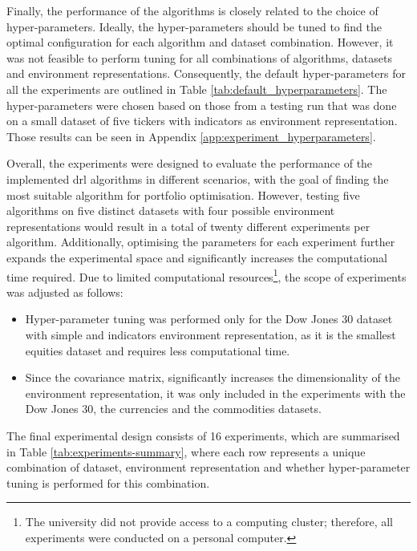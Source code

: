 Finally, the performance of the algorithms is closely related to the choice of hyper-parameters. Ideally, the hyper-parameters should be tuned to find the optimal configuration for each algorithm and dataset combination. However, it was not feasible to perform tuning for all combinations of algorithms, datasets and environment representations. Consequently, the default hyper-parameters for all the experiments are outlined in Table \ref{tab:default_hyperparameters}. The hyper-parameters were chosen based on those from a testing run that was done on a small dataset of five tickers with indicators as environment representation. Those results can be seen in Appendix \ref{app:experiment_hyperparameters}.



Overall, the experiments were designed to evaluate the performance of the implemented \acrshort{drl} algorithms in different scenarios, with the goal of finding the most suitable algorithm for portfolio optimisation. However, testing five algorithms on five distinct datasets with four possible environment representations would result in a total of twenty different experiments per algorithm. Additionally, optimising the parameters for each experiment further expands the experimental space and significantly increases the computational time required. Due to limited computational resources\footnote{The university did not provide access to a computing cluster; therefore, all experiments were conducted on a personal computer.}, the scope of experiments was adjusted as follows:
\begin{itemize}
    \item Hyper-parameter tuning was performed only for the Dow Jones 30 dataset with simple and indicators environment representation, as it is the smallest equities dataset and requires less computational time.
    \item Since the covariance matrix, significantly increases the dimensionality of the environment representation, it was only included in the experiments with the Dow Jones 30, the currencies and the commodities datasets.
\end{itemize}

The final experimental design consists of 16 experiments, which are summarised in Table \ref{tab:experiments-summary}, where each row represents a unique combination of dataset, environment representation and whether hyper-parameter tuning is performed for this combination.

